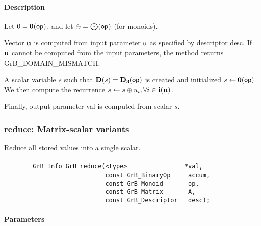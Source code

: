 \paragraph{Description}


Let $0 = \bold{0}({\sf op})$, and let $\oplus = \bigodot({\sf op})$ (for monoids).

Vector ${\bf u}$ is computed from input parameter ${\sf u}$ as
specified by descriptor {\sf desc}. If ${\bf u}$ cannot be computed
from the input parameters, the method returns {\sf GrB\_DOMAIN\_MISMATCH}.

A scalar variable $s$ such that $\bold{D}(s) = \bold{D_3}({\sf op})$ is
created and initialized $s \leftarrow \bold{0}({\sf op})$. 
We then compute the recurrence $s \leftarrow s \oplus u_i, \forall i \in {\bf i}({\bf u})$.

Finally, output parameter {\sf val} is computed from scalar $s$.

\subsubsection{{\sf reduce}: Matrix-scalar variants}
\label{Sec:Reduce_matrix_scalar}

Reduce all stored values into a single scalar.

\paragraph{\syntax}

\begin{verbatim}
        GrB_Info GrB_reduce(<type>                *val,
                            const GrB_BinaryOp     accum,
                            const GrB_Monoid       op,
                            const GrB_Matrix       A,
                            const GrB_Descriptor   desc);
\end{verbatim}


\paragraph{Parameters}

